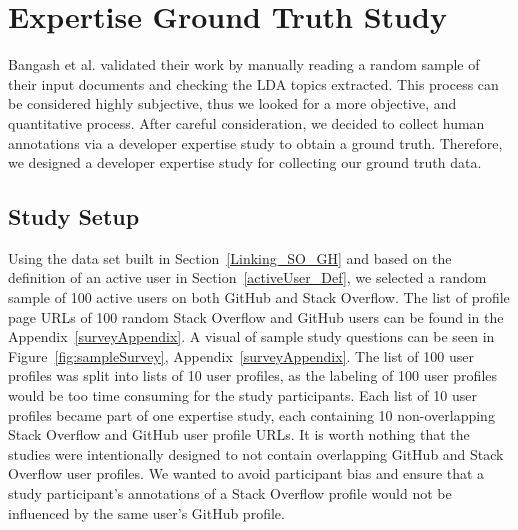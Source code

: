     \section{Expertise Ground Truth Study} \label{sec:expertise_survey}
    
        Bangash et al. \cite{bangash2019developers} validated their work by manually reading a random sample of their input documents and checking the LDA topics extracted. This process can be considered highly subjective, thus we looked for a more objective, and quantitative process. After careful consideration, we decided to collect human annotations via a developer expertise study to obtain a ground truth. Therefore, we designed a developer expertise study for collecting our ground truth data. 
    
        \subsection{Study Setup}
        
            Using the data set built in Section~\ref{Linking_SO_GH} and based on the definition of an active user in Section~\ref{activeUser_Def}, we selected a random sample of 100 active users on both GitHub and Stack Overflow. The list of profile page URLs of 100 random Stack Overflow and GitHub users can be found in the Appendix~\ref{surveyAppendix}. A visual of sample study questions can be seen in Figure~\ref{fig:sampleSurvey}, Appendix~\ref{surveyAppendix}. The list of 100 user profiles was split into lists of 10 user profiles, as the labeling of 100 user profiles would be too time consuming for the study participants. Each list of 10 user profiles became part of one expertise study, each containing 10 non-overlapping Stack Overflow and GitHub user profile URLs. It is worth nothing that the studies were intentionally designed to not contain overlapping GitHub and Stack Overflow user profiles. We wanted to avoid participant bias and ensure that a study participant's annotations of a Stack Overflow profile would not be influenced by the same user's GitHub profile.
            
